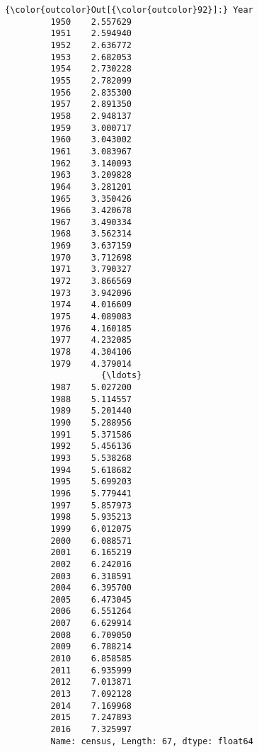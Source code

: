 \documentclass[11pt]{article}
\begin{document}
\begin{Verbatim}[commandchars=\\\{\}]
{\color{outcolor}Out[{\color{outcolor}92}]:} Year
         1950    2.557629
         1951    2.594940
         1952    2.636772
         1953    2.682053
         1954    2.730228
         1955    2.782099
         1956    2.835300
         1957    2.891350
         1958    2.948137
         1959    3.000717
         1960    3.043002
         1961    3.083967
         1962    3.140093
         1963    3.209828
         1964    3.281201
         1965    3.350426
         1966    3.420678
         1967    3.490334
         1968    3.562314
         1969    3.637159
         1970    3.712698
         1971    3.790327
         1972    3.866569
         1973    3.942096
         1974    4.016609
         1975    4.089083
         1976    4.160185
         1977    4.232085
         1978    4.304106
         1979    4.379014
                   {\ldots}   
         1987    5.027200
         1988    5.114557
         1989    5.201440
         1990    5.288956
         1991    5.371586
         1992    5.456136
         1993    5.538268
         1994    5.618682
         1995    5.699203
         1996    5.779441
         1997    5.857973
         1998    5.935213
         1999    6.012075
         2000    6.088571
         2001    6.165219
         2002    6.242016
         2003    6.318591
         2004    6.395700
         2005    6.473045
         2006    6.551264
         2007    6.629914
         2008    6.709050
         2009    6.788214
         2010    6.858585
         2011    6.935999
         2012    7.013871
         2013    7.092128
         2014    7.169968
         2015    7.247893
         2016    7.325997
         Name: census, Length: 67, dtype: float64
\end{Verbatim}
            
\end{document}
